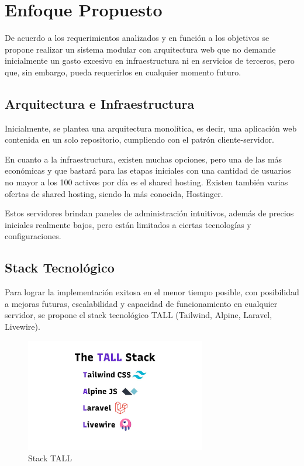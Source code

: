 \section{Enfoque Propuesto}

De acuerdo a los requerimientos analizados y en función a los objetivos se propone realizar un sistema modular con arquitectura web que no demande inicialmente un gasto excesivo en infraestructura ni en servicios de terceros, pero que, sin embargo, pueda requerirlos en cualquier momento futuro.

\subsection{Arquitectura e Infraestructura}

Inicialmente, se plantea una arquitectura monolítica, es decir, una aplicación web contenida en un solo repositorio, cumpliendo con el patrón cliente-servidor.

En cuanto a la infraestructura, existen muchas opciones, pero una de las más económicas y que bastará para las etapas iniciales con una cantidad de usuarios no mayor a los 100 activos por día es el shared hosting. Existen también varias ofertas de shared hosting, siendo la más conocida, Hostinger.

Estos servidores brindan paneles de administración intuitivos, además de precios iniciales realmente bajos, pero están limitados a ciertas tecnologías y configuraciones.

\subsection{Stack Tecnológico}

Para lograr la implementación exitosa en el menor tiempo posible, con posibilidad a mejoras futuras, escalabilidad y capacidad de funcionamiento en cualquier servidor, se propone el stack tecnológico TALL (Tailwind, Alpine, Laravel, Livewire). 

\begin{figure}[htbp]
    \centering
    \includegraphics[width=0.7\textwidth]{assets/tall.jpg}
    \caption{Stack TALL}
    \label{fig:tall}
\end{figure}

